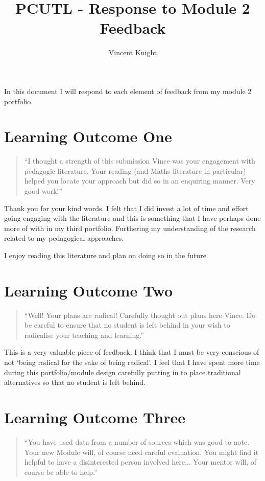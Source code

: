 \documentclass[a4paper,12pt]{article}
\title{PCUTL - Response to Module 2 Feedback}
\author{Vincent Knight}
\date{}
\begin{document}
\maketitle

In this document I will respond to each element of feedback from my module 2 portfolio.

\section{Learning Outcome One}

\begin{quote}
    ``I thought a strength of this submission Vince was your engagement with pedagogic literature. Your reading (and Maths literature in particular) helped you locate your approach but did so in an enquiring manner. Very good work!''
\end{quote}

Thank you for your kind words. I felt that I did invest a lot of time and effort going engaging with the literature and this is something that I have perhaps done more of with in my third portfolio. Furthering my understanding of the research related to my pedagogical approaches.

I enjoy reading this literature and plan on doing so in the future.

\section{Learning Outcome Two}

\begin{quote}
    ``Well! Your plans are radical! Carefully thought out plans here Vince. Do be careful to ensure that no student is left behind in your wish to radicalise your teaching and learning.''
\end{quote}

This is a very valuable piece of feedback. I think that I must be very conscious of not `being radical for the sake of being radical'. I feel that I have spent more time during this portfolio/module design carefully putting in to place traditional alternatives so that no student is left behind.

\section{Learning Outcome Three}

\begin{quote}
    ``You have used data from a number of sources which was good to note. Your new Module will, of course need careful evaluation. You might find it helpful to have a disinterested person involved here... Your mentor will, of course be able to help.''
\end{quote}
\end{document}
